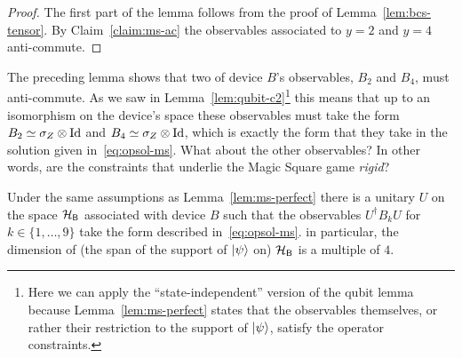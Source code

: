 \begin{proof}
The first part of the lemma follows from the proof of Lemma~\ref{lem:bcs-tensor}. By Claim~\ref{claim:ms-ac} the observables associated to $y=2$ and $y=4$ anti-commute. 
\end{proof}

The preceding lemma shows that two of device $B$'s observables, $B_2$ and $B_4$, must anti-commute. As we saw in Lemma~\ref{lem:qubit-c2}\footnote{Here we can apply the ``state-independent'' version of the qubit lemma because Lemma~\ref{lem:ms-perfect} states that the observables themselves, or rather their restriction to the support of $|\psi\rangle$, satisfy the operator constraints.} this means that up to an isomorphism on the device's space these observables must take the form $B_2 \simeq \sigma_Z \otimes \mathop{\rm Id}\nolimits$ and $B_4 \simeq \sigma_Z \otimes \mathop{\rm Id}\nolimits$, which is exactly the form that they take in the solution given in~\eqref{eq:opsol-ms}. What about the other observables? In other words, are the constraints that underlie the Magic Square game \emph{rigid}? 

\begin{lemma}\label{lem:ms-perfect-rigid}
Under the same assumptions as Lemma~\ref{lem:ms-perfect} there is a unitary $U$ on the space $\mathcal{H}_{\textsf{B}}$ associated with device $B$ such that the observables $U^\dagger B_k U$ for $k\in\{1,\ldots,9\}$ take the form described in~\eqref{eq:opsol-ms}. in particular, the dimension of (the span of the support of $|\psi\rangle$ on) $\mathcal{H}_{\textsf{B}}$ is a multiple of $4$. 
\end{lemma}

